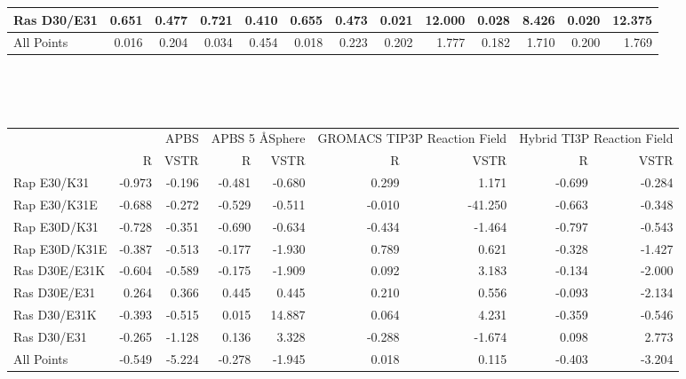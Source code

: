 \documentclass[landscape]{article}
\begin{document}
{\begin{tabular}{ l || r r | r r | r r | r r| r r | r r}
Ras D30/E31    & 0.651          & 0.477          & 0.721          & 0.410          & 0.655          & 0.473          & 0.021          & 12.000         & 0.028          & 8.426          & 0.020          & 12.375        \\
\hline
All Points     & 0.016          &  0.204         & 0.034          &  0.454         & 0.018          &  0.223         & 0.202          &  1.777         & 0.182          &  1.710         & 0.200          &  1.769        \\
\end{tabular}\\
}\\
{
\begin{tabular}{ l || r r| r r| r r| r r}
 & \multicolumn{2}{|C{2cm}}{APBS} & \multicolumn{2}{|C{2cm}}{APBS 5 \AA  Sphere} & \multicolumn{2}{|C{2cm}}{GROMACS TIP3P Reaction Field} & \multicolumn{2}{|C{2cm}}{Hybrid TI3P Reaction Field} \\
 & \multicolumn{1}{|C{1cm}}{R} & \multicolumn{1}{C{1cm}}{VSTR} & \multicolumn{1}{|C{1cm}}{R} & \multicolumn{1}{C{1cm}}{VSTR} & \multicolumn{1}{|C{1cm}}{R} & \multicolumn{1}{C{1cm}}{VSTR} & \multicolumn{1}{|C{1cm}}{R} & \multicolumn{1}{C{1cm}}{VSTR} \\
\hline\hline
Rap E30/K31    & -0.973         & -0.196         & -0.481         & -0.680         & 0.299          & 1.171          & -0.699         & -0.284        \\
Rap E30/K31E   & -0.688         & -0.272         & -0.529         & -0.511         & -0.010         & -41.250        & -0.663         & -0.348        \\
Rap E30D/K31   & -0.728         & -0.351         & -0.690         & -0.634         & -0.434         & -1.464         & -0.797         & -0.543        \\
Rap E30D/K31E  & -0.387         & -0.513         & -0.177         & -1.930         & 0.789          & 0.621          & -0.328         & -1.427        \\
Ras D30E/E31K  & -0.604         & -0.589         & -0.175         & -1.909         & 0.092          & 3.183          & -0.134         & -2.000        \\
Ras D30E/E31   & 0.264          & 0.366          & 0.445          & 0.445          & 0.210          & 0.556          & -0.093         & -2.134        \\
Ras D30/E31K   & -0.393         & -0.515         & 0.015          & 14.887         & 0.064          & 4.231          & -0.359         & -0.546        \\
Ras D30/E31    & -0.265         & -1.128         & 0.136          & 3.328          & -0.288         & -1.674         & 0.098          & 2.773         \\
\hline
All Points     & -0.549         &-5.224          & -0.278         &-1.945          & 0.018          &  0.115         & -0.403         &-3.204         \\
\end{tabular}\\
}\\
\end{document}
